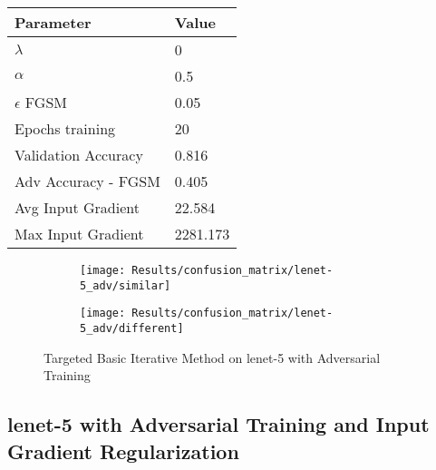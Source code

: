 \documentclass[draft,final]{vutinfth} %
\begin{document}
\begin{table}[h]
  \centering
  \begin{tabular}{ll}
    \toprule
			Parameter			& Value   \\
    \midrule
			$\lambda$								& 0				\\
			$\alpha$								& 0.5			\\
			$\epsilon$ FGSM					& 0.05		\\
			Epochs training					& 20			\\
			
			Validation Accuracy			& 0.816		\\ 
			Adv Accuracy - FGSM			& 0.405		\\
			
			Avg Input Gradient			& 22.584	\\
			Max Input Gradient			& 2281.173\\
    \bottomrule
  \end{tabular}
\end{table}


\begin{figure}[h]
  \begin{subfigure}[b]{0.5\columnwidth}
		\centering
    \texttt{[image: Results/confusion\_matrix/lenet-5\_adv/similar]}
    \label{fig:exp:cm:lenet-5_adv:similar}
  \end{subfigure}
  \begin{subfigure}[b]{0.5\columnwidth}
		\centering
    \texttt{[image: Results/confusion\_matrix/lenet-5\_adv/different]}
    \label{fig:exp:cm:lenet-5_adv:different}
  \end{subfigure}
  \caption{Targeted Basic Iterative Method on lenet-5 with Adversarial Training}
  \label{fig:exp:cm:lenet-5_adv}
\end{figure}
\clearpage

\subsection{lenet-5 with Adversarial Training and Input Gradient Regularization}
\end{document}
